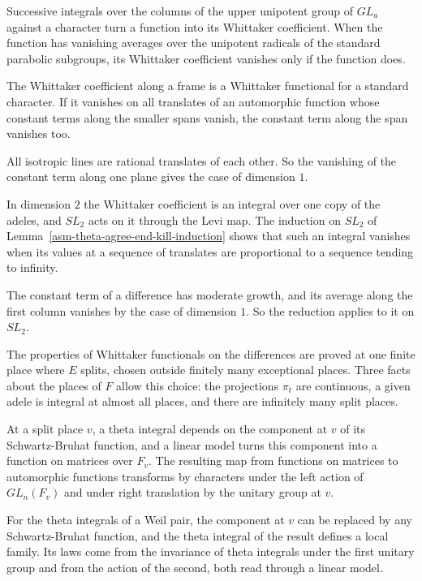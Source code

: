 Successive integrals over the columns of the upper unipotent group of $GL_a$
against a character turn a function into its Whittaker coefficient. When the
function has vanishing averages over the unipotent radicals of the standard
parabolic subgroups, its Whittaker coefficient vanishes only if the function
does.

The Whittaker coefficient along a frame is a Whittaker functional for a
standard character. If it vanishes on all translates of an automorphic function
whose constant terms along the smaller spans vanish, the constant term along the
span vanishes too.

All isotropic lines are rational translates of each other. So the vanishing of
the constant term along one plane gives the case of dimension $1$.

In dimension $2$ the Whittaker coefficient is an integral over one copy of the
adeles, and $SL_2$ acts on it through the Levi map. The induction on $SL_2$ of
Lemma~\ref{asm-theta-agree-end-kill-induction} shows that such an integral
vanishes when its values at a sequence of translates are proportional to a
sequence tending to infinity.

The constant term of a difference has moderate growth, and its average along
the first column vanishes by the case of dimension $1$. So the reduction applies
to it on $SL_2$.

The properties of Whittaker functionals on the differences are proved at one
finite place where $E$ splits, chosen outside finitely many exceptional places.
Three facts about the places of $F$ allow this choice: the projections $\pi_t$
are continuous, a given adele is integral at almost all places, and there are
infinitely many split places.

At a split place $v$, a theta integral depends on the component at $v$ of its
Schwartz-Bruhat function, and a linear model turns this component into a
function on matrices over $F_v$. The resulting map from functions on matrices to
automorphic functions transforms by characters under the left action of
$GL_n(F_v)$ and under right translation by the unitary group at $v$.

For the theta integrals of a Weil pair, the component at $v$ can be replaced by
any Schwartz-Bruhat function, and the theta integral of the result defines a
local family. Its laws come from the invariance of theta integrals under the
first unitary group and from the action of the second, both read through a
linear model.

